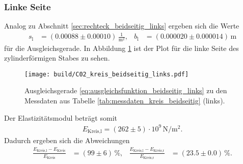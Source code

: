 \subsubsection{Linke Seite}
Analog zu Abschnitt \ref{sec:rechteck_beidseitig_links} ergeben sich die Werte
\begin{align*}
    s_\text{l} &= (\num{0.00088} \pm \num{0.00010}) \, \frac{1}{\unit{\meter^2}}, & 
    b_\text{l} &= (\num{0.000020} \pm \num{0.000014}) \, \unit{\meter}
\end{align*}
für die Ausgleichsgerade.
In Abbildung \ref{fig:plot_kreis_beidseitig_links} ist der Plot für die linke Seite des zylinderförmigen Stabes zu sehen.
%
\begin{figure}[H]
    \centering
    \texttt{[image: build/C02\_kreis\_beidseitig\_links.pdf]}
    \caption{Ausgleichsgerade \eqref{eq:ausgleichsfunktion_beidseitig_links} zu den Messdaten aus Tabelle \ref{tab:messdaten_kreis_beidseitig} (links).}
    \label{fig:plot_kreis_beidseitig_links}
\end{figure}

\noindent
Der Elastizitätsmodul beträgt somit
\begin{align}
    E_\text{Kreis,l} = (\num{262} \pm \num{5}) \cdot 10^9 \, \unit{\newton\per\meter^2}.
\end{align}
Dadurch ergeben sich die Abweichungen
\begin{align*}
    \frac{E_\text{Kreis,l} - E_\text{Kreis}}{E_\text{Kreis}} &= (\num{99} \pm \num{6}) \, \%, &
    \frac{E_\text{Kreis,l} - E_\text{Kreis,r}}{E_\text{Kreis,r}} &= (\num{23.5} \pm \num{0.0}) \, \%.
\end{align*}
